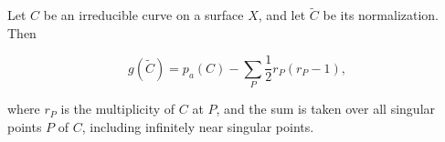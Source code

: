 Let $C$ be an irreducible curve on a surface $X$, and let $\tilde{C}$ be its normalization. Then

$$g(\tilde{C}) = p_a(C) - \sum_P \frac{1}{2} r_P(r_P - 1),$$

where $r_P$ is the multiplicity of $C$ at $P$, and the sum is taken over all singular points $P$ of $C$, including infinitely near singular points.
